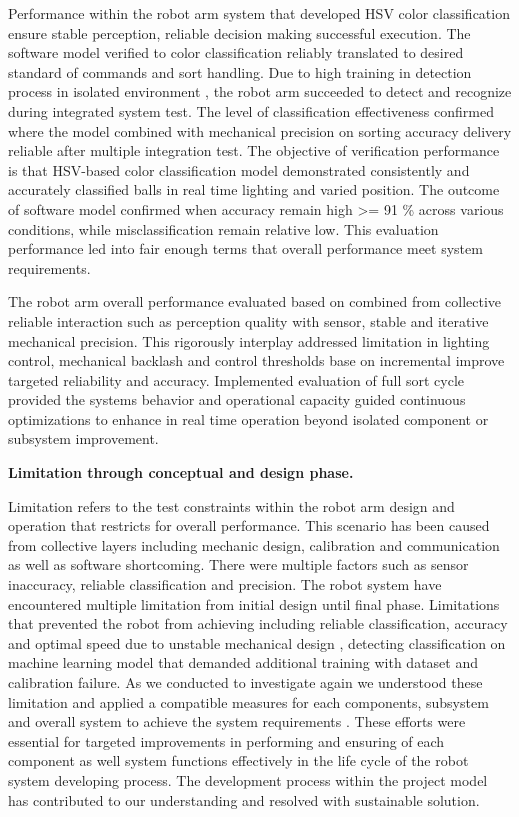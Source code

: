  Performance within the robot arm system that developed HSV color classification ensure stable perception, reliable decision making successful execution. The software model verified to color classification reliably translated to desired standard of commands and sort handling. Due to high training in detection process in isolated environment , the robot arm succeeded to detect and recognize during integrated system test. The level of classification effectiveness confirmed where the model combined with mechanical precision on sorting accuracy delivery reliable after multiple integration test. The objective of verification performance is that HSV-based color classification model demonstrated consistently and accurately classified balls in real time lighting and varied position. The outcome of software model confirmed when accuracy remain high >= 91 \% across various conditions, while misclassification remain relative low. This evaluation performance  led into fair enough terms that overall performance meet system requirements. 

The robot arm overall performance evaluated based on combined from collective reliable interaction such as perception quality with sensor, stable and iterative mechanical precision. This rigorously interplay addressed limitation in lighting control, mechanical backlash and control thresholds base on incremental improve targeted reliability and accuracy. Implemented evaluation of full sort cycle provided the systems behavior and operational capacity guided continuous optimizations to enhance in real time operation beyond isolated component or subsystem improvement.

\textbf{Limitation through conceptual and design phase.}




Limitation refers to the test  constraints within the robot arm design and operation that restricts for overall performance. This scenario has been caused from collective layers including mechanic design, calibration and communication as well as software shortcoming. There were multiple factors such as sensor inaccuracy, reliable classification and precision. The robot system have encountered multiple limitation from initial design until final phase. Limitations that prevented the robot from achieving including reliable classification, accuracy and optimal speed due to unstable mechanical design , detecting classification on machine learning model that demanded additional training with dataset and calibration failure. As we conducted to investigate again we understood these limitation and applied a compatible measures for each components, subsystem and overall system to achieve the system requirements . These efforts were essential for targeted improvements in performing and ensuring of each component as well system functions effectively in the life cycle of the robot system developing process. The development process within the project model has contributed to our understanding and resolved with sustainable solution. 

